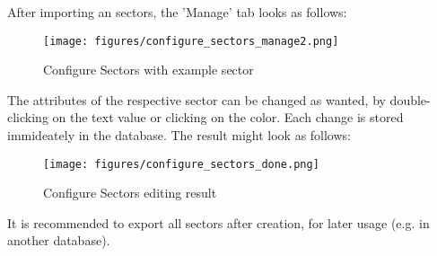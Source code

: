 After importing an sectors, the 'Manage' tab looks as follows:

\begin{figure}[H]
    \texttt{[image: figures/configure\_sectors\_manage2.png]}
  \caption{Configure Sectors with example sector}
\end{figure}

The attributes of the respective sector can be changed as wanted, by double-clicking on the text value or clicking on the color. Each change is stored immideately in the database. The result might look as follows:\\

\begin{figure}[H]
    \texttt{[image: figures/configure\_sectors\_done.png]}
  \caption{Configure Sectors editing result}
\end{figure}

It is recommended to export all sectors after creation, for later usage (e.g. in another database).
